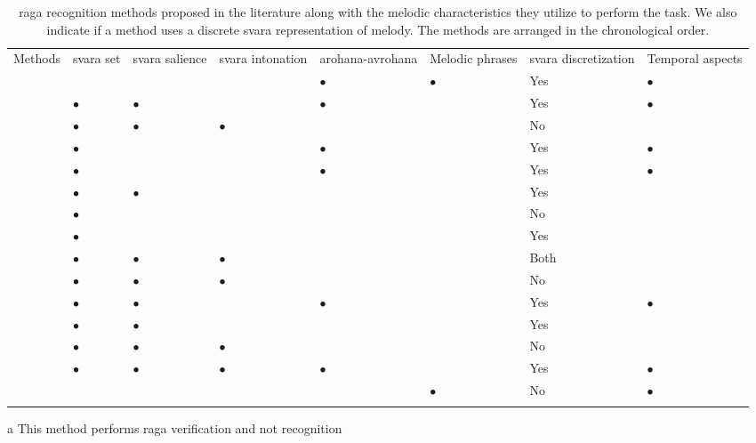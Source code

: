 \begin{table}
	\begin{threeparttable} 
		\small
		\begin{centering}
			\begin{tabular}{l L{1.85cm} L{1.85cm} L{1.85cm} L{2cm} L{1.5cm} L{2cm} L{2cm}}
				\tabletop
				Methods & \Gls{svara} set & \Gls{svara} salience & \Gls{svara} intonation & \gls{arohana}-\gls{avrohana} & Melodic phrases & \Gls{svara} discretization & Temporal aspects\tabularnewline
				\tablemid
				\cite{pandey2003tansen} &  &  &  & $\bullet$ & $\bullet$ & Yes & $\bullet$\tabularnewline
				\cite{chordia2007raag} & $\bullet$ & $\bullet$ &  & $\bullet$ &  & Yes & $\bullet$\tabularnewline
				\cite{belle2009raga} & $\bullet$ & $\bullet$ & $\bullet$ &  &  & No & \tabularnewline
				\cite{Shetty2009} & $\bullet$ &  &  & $\bullet$ &  & Yes & $\bullet$\tabularnewline
				\cite{sridhar2009raga} & $\bullet$ &  &  & $\bullet$ &  & Yes & $\bullet$\tabularnewline
				\cite{koduri2011survey} & $\bullet$ & $\bullet$ &  &  &  & Yes & \tabularnewline
				\cite{ranjani2011carnatic} & $\bullet$ &  &  &  &  & No & \tabularnewline
				\cite{chakraborty2012object} & $\bullet$ &  &  &  &  & Yes & \tabularnewline
				\cite{koduri2012raga} & $\bullet$ & $\bullet$ & $\bullet$ &  &  & Both & \tabularnewline
				\cite{chordia2013joint} & $\bullet$ & $\bullet$ & $\bullet$ &  &  & No & \tabularnewline
				\cite{dighe2013scale} & $\bullet$ & $\bullet$ &  & $\bullet$ &  & Yes & $\bullet$\tabularnewline
				\cite{dighe2013swara} & $\bullet$ & $\bullet$ &  &  &  & Yes & \tabularnewline
				\cite{koduri2014intonation} & $\bullet$ & $\bullet$ & $\bullet$ &  &  & No & \tabularnewline
				\cite{kumar2014identifying} & $\bullet$ & $\bullet$ & $\bullet$ & $\bullet$ &  & Yes & $\bullet$\tabularnewline
				\cite{shrey_ISMIR_2015} &  &  &  &  & $\bullet$ & No & $\bullet$\tabularnewline	
				\tablebot
			\end{tabular}
			\par \end{centering}
		
		\begin{tablenotes}
			\item[a] This method performs \gls{raga} verification and not recognition
		\end{tablenotes}
		\caption[Melodic characteristics utilized by the existing \gls{raga} recognition methods]{\Gls{raga} recognition methods proposed in the literature along with the melodic characteristics they utilize to perform the task. We also indicate if a method uses a discrete \gls{svara} representation of melody. The methods are arranged in the chronological order.}
		\label{tab:raga_recognition_methods_melodic_characteristics}
	\end{threeparttable}
\end{table}


